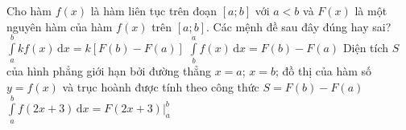 %
\begin{ex}%
	Cho hàm $ f(x)$ là hàm liên tục trên đoạn $\left[a;b\right]$ với $ a<b$ và $F(x)$ là một nguyên hàm của hàm $ f(x)$ trên $\left[a;b\right]$. Các mệnh đề sau đây đúng hay sai?
	\choiceTF
	{\True $\int\limits_a^b{kf(x)\mathrm{\,d}x}=k\left[F(b)-F(a)\right]$}
	{$\int\limits_b^af(x)\mathrm{\,d}x=F(b)-F(a)$}
	{Diện tích $S$ của hình phẳng giới hạn bởi đường thẳng $x=a$; $x=b$; đồ thị của hàm số $ y=f(x)$ và trục hoành được tính theo công thức $ S=F(b)-F(a)$}
	{$\int\limits_a^b{f\left(2x+3\right)\mathrm{\,d}x}=F\left(2x+3\right)\big|_a^b$}
\end{ex}
%
